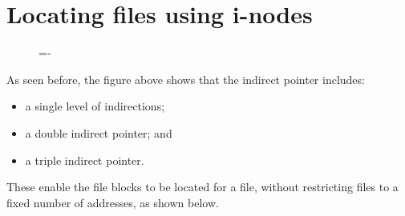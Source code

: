 \documentclass[a4paper]{systems-software}
\begin{document}
\section{Locating files using i-nodes}

\begin{figure}[H]
  \lineskip=-\fboxrule
\end{figure}

As seen before, the figure above shows that the indirect pointer includes:
\begin{itemize}
	\item a single level of indirections;
	\item a double indirect pointer; and
	\item a triple indirect pointer.
\end{itemize}

These enable the file blocks to be located for a file, without restricting files to a fixed number of addresses, as shown below.
\end{document}
